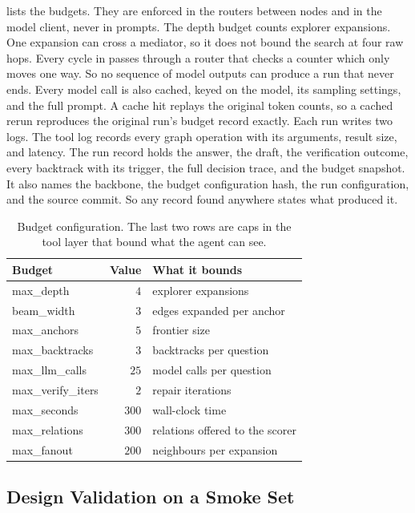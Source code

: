  lists the budgets. They are enforced in the routers between
nodes and in the model client, never in prompts. The depth budget counts
explorer expansions. One expansion can cross a mediator, so it does not bound
the search at four raw hops. Every cycle in  passes
through a router that checks a counter which only moves one way. So no sequence
of model outputs can produce a run that never ends. Every model call is also
cached, keyed on the model, its sampling settings, and the full prompt. A cache
hit replays the original token counts, so a cached rerun reproduces the original
run's budget record exactly. Each run writes two logs. The tool log records
every graph operation with its arguments, result size, and latency. The run
record holds the answer, the draft, the verification outcome, every backtrack
with its trigger, the full decision trace, and the budget snapshot. It also
names the backbone, the budget configuration hash, the run configuration, and
the source commit. So any record found anywhere states what produced it.

\begin{table}[!t]
\caption{Budget configuration. The last two rows are caps in the tool layer that
  bound what the agent can see.}
\label{tab:budget}
\centering
\small
\begin{tabular}{@{}lrl@{}}
\toprule
Budget & Value & What it bounds \\
\midrule
\textsf{max\_depth} & $4$ & explorer expansions \\
\textsf{beam\_width} & $3$ & edges expanded per anchor \\
\textsf{max\_anchors} & $5$ & frontier size \\
\textsf{max\_backtracks} & $3$ & backtracks per question \\
\textsf{max\_llm\_calls} & $25$ & model calls per question \\
\textsf{max\_verify\_iters} & $2$ & repair iterations \\
\textsf{max\_seconds} & $300$ & wall-clock time \\
\midrule
\textsf{max\_relations} & $300$ & relations offered to the scorer \\
\textsf{max\_fanout} & $200$ & neighbours per expansion \\
\bottomrule
\end{tabular}
\end{table}

\subsection{Design Validation on a Smoke Set}\label{sec:smoke}

